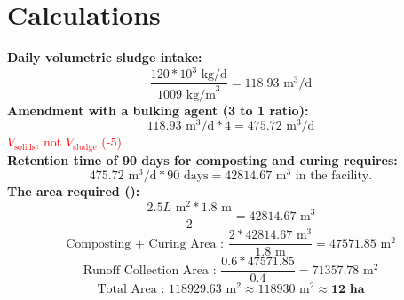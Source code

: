 \documentclass[a4paper]{article}
\begin{document}
\section*{Calculations}
\textbf{Daily volumetric sludge intake:}
$$\frac{120*10^3 \text{ kg/d}}{1009 \text{ kg/m}^3} = 118.93 \text{ m}^3\text{/d}$$
\textbf{Amendment with a bulking agent (3 to 1 ratio):}
$$118.93 \text{ m}^3\text{/d} * 4 = 475. 72 \text{ m}^3\text{/d}$$
\textcolor{red}{$V_\text{solids}$, not $V_\text{sludge}$ (-5)}\\
\textbf{Retention time of 90 days for composting and curing requires:}
$$475. 72 \text{ m}^3\text{/d} * 90 \text{ days} = 42814.67 \text{ m}^3 \text{ in the facility.}$$
\textbf{The area required ():}
$$\frac{2.5L\text{ m}^2*1.8\text{ m}}{2}=42814.67 \text{ m}^3 $$
$$\text{Composting + Curing Area : } \frac{2*42814.67\text{ m}^3}{1.8\text{ m}}=47571.85 \text{ m}^2$$
$$\text{Runoff Collection Area : } \frac{0.6*47571.85}{0.4}=71357.78 \text{ m}^2$$
$$\text{Total Area : } 118929.63 \text{ m}^2 \approx 118930 \text{ m}^2 \approx \textbf{12 ha}$$
\end{document}
